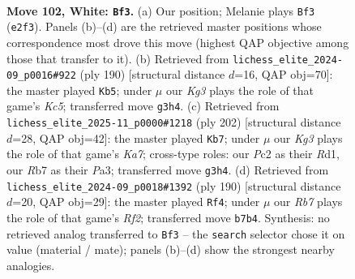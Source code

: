 \documentclass[11pt]{article}
\begin{document}
\clearpage

\begin{figure}[p]\centering
\begin{subfigure}{0.46\textwidth}\centering
\resizebox{\linewidth}{!}{%
\newchessgame
\chessboard[
  setfen={r7/PR3n2/6k1/6P1/8/6KP/2P1B3/8 w - - 3 102},
  showmover=false,
  pgfstyle=straightmove, color=movearrow, markmove={e2-f3}
]}
\caption{}
\end{subfigure}\hfill
\begin{subfigure}{0.46\textwidth}\centering
\resizebox{\linewidth}{!}{%
\newchessgame
\chessboard[
  setfen={8/8/r7/P1K2kP1/R4n1p/7P/8/8 w - - 0 96},
  showmover=false,
  pgfstyle=straightmove, color=movearrow, markmove={c5-b5}
]}
\caption{}
\end{subfigure}
\\[4pt]
\begin{subfigure}{0.46\textwidth}\centering
\resizebox{\linewidth}{!}{%
\newchessgame
\chessboard[
  setfen={3r4/K7/8/2kP4/2P5/P7/8/3R4 w - - 15 102},
  showmover=false,
  pgfstyle=straightmove, color=movearrow, markmove={a7-b7}
]}
\caption{}
\end{subfigure}\hfill
\begin{subfigure}{0.46\textwidth}\centering
\resizebox{\linewidth}{!}{%
\newchessgame
\chessboard[
  setfen={8/p4k2/2P2P2/3K4/8/P1r5/5R2/8 w - - 1 96},
  showmover=false,
  pgfstyle=straightmove, color=movearrow, markmove={f2-f4}
]}
\caption{}
\end{subfigure}
\caption{\textbf{Move 102, White: \texttt{Bf3}.} (a) Our position; Melanie plays \texttt{Bf3} (\texttt{e2f3}). Panels (b)--(d) are the retrieved master positions whose correspondence most drove this move (highest QAP objective among those that transfer to it). (b) Retrieved from \texttt{lichess\_elite\_2024-09\_p0016\#922} (ply 190) [structural distance $d$=16, QAP obj=70]: the master played \texttt{Kb5}; under $\mu$ our \emph{Kg3} plays the role of that game's \emph{Kc5}; transferred move \texttt{g3h4}. (c) Retrieved from \texttt{lichess\_elite\_2025-11\_p0000\#1218} (ply 202) [structural distance $d$=28, QAP obj=42]: the master played \texttt{Kb7}; under $\mu$ our \emph{Kg3} plays the role of that game's \emph{Ka7}; cross-type roles: our \emph{P}c2 as their \emph{R}d1, our \emph{R}b7 as their \emph{P}a3; transferred move \texttt{g3h4}. (d) Retrieved from \texttt{lichess\_elite\_2024-09\_p0018\#1392} (ply 190) [structural distance $d$=20, QAP obj=29]: the master played \texttt{Rf4}; under $\mu$ our \emph{Rb7} plays the role of that game's \emph{Rf2}; transferred move \texttt{b7b4}. Synthesis: no retrieved analog transferred to \texttt{Bf3} -- the \texttt{search} selector chose it on value (material / mate); panels (b)--(d) show the strongest nearby analogies.}
\label{fig:thought-m202}
\end{figure}
\end{document}
